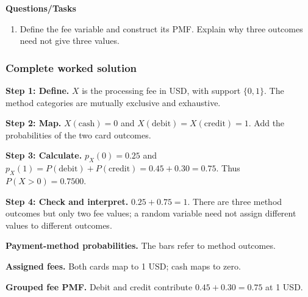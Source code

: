 \textbf{Questions/Tasks}
\begin{enumerate}
\item Define the fee variable and construct its PMF. Explain why three outcomes need not give three values.
\end{enumerate}
\subsubsection*{Complete worked solution}
\par\noindent\begin{minipage}{\linewidth}
\textbf{Step 1: Define.} $X$ is the processing fee in USD, with support $\{0,1\}$. The method categories are mutually exclusive and exhaustive.
\end{minipage}\par\medskip
\par\noindent\begin{minipage}{\linewidth}
\textbf{Step 2: Map.} $X(\text{cash})=0$ and $X(\text{debit})=X(\text{credit})=1$. Add the probabilities of the two card outcomes.
\end{minipage}\par\medskip
\par\noindent\begin{minipage}{\linewidth}
\textbf{Step 3: Calculate.} $p_X(0)=0.25$ and $p_X(1)=P(\text{debit})+P(\text{credit})=0.45+0.30=0.75$. Thus $P(X>0)=0.7500$.
\end{minipage}\par\medskip
\par\noindent\begin{minipage}{\linewidth}
\textbf{Step 4: Check and interpret.} $0.25+0.75=1$. There are three method outcomes but only two fee values; a random variable need not assign different values to different outcomes.
\end{minipage}\par\medskip
\par\noindent \begin{minipage}[t]{.32\linewidth}
\centering
{}
\par\small \textbf{Payment-method probabilities.} The bars refer to method outcomes.
\end{minipage}\hfill\begin{minipage}[t]{.32\linewidth}
\centering
{}
\par\small \textbf{Assigned fees.} Both cards map to 1 USD; cash maps to zero.
\end{minipage}\hfill\begin{minipage}[t]{.32\linewidth}
\centering
{}
\par\small \textbf{Grouped fee PMF.} Debit and credit contribute $0.45+0.30=0.75$ at 1 USD.
\end{minipage}\par\medskip


